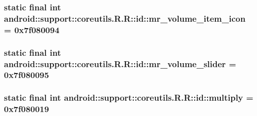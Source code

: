 \hypertarget{classandroid_1_1support_1_1coreutils_1_1_r_1_1id_4b64394cc2de1cfb6beefc379fbd92ba}{
\subsubsection[{mr\_\-volume\_\-item\_\-icon}]{\setlength{\rightskip}{0pt plus 5cm}static final int android::support::coreutils.R.R::id::mr\_\-volume\_\-item\_\-icon = 0x7f080094}}
\label{classandroid_1_1support_1_1coreutils_1_1_r_1_1id_4b64394cc2de1cfb6beefc379fbd92ba}


\hypertarget{classandroid_1_1support_1_1coreutils_1_1_r_1_1id_4113073fac841bde26e22c387442b10a}{
\subsubsection[{mr\_\-volume\_\-slider}]{\setlength{\rightskip}{0pt plus 5cm}static final int android::support::coreutils.R.R::id::mr\_\-volume\_\-slider = 0x7f080095}}
\label{classandroid_1_1support_1_1coreutils_1_1_r_1_1id_4113073fac841bde26e22c387442b10a}


\hypertarget{classandroid_1_1support_1_1coreutils_1_1_r_1_1id_8a3739f893616f62b10ba70ecbbd91ba}{
\subsubsection[{multiply}]{\setlength{\rightskip}{0pt plus 5cm}static final int android::support::coreutils.R.R::id::multiply = 0x7f080019}}
\label{classandroid_1_1support_1_1coreutils_1_1_r_1_1id_8a3739f893616f62b10ba70ecbbd91ba}


